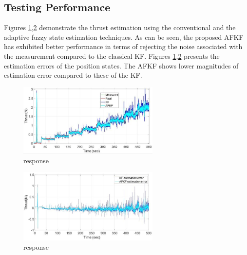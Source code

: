 \documentclass[conference]{IEEEtran}
\begin{document}
\subsection{Testing Performance}
Figures \ref{akf1},\ref{akf2} demonstrate the thrust estimation using the conventional and the adaptive fuzzy state estimation techniques. As can be seen, the proposed AFKF has exhibited better performance in terms of rejecting the noise associated with the measurement compared to the classical KF. Figures \ref{akf1},\ref{akf2} presents the estimation errors of the position states. The AFKF shows lower magnitudes of estimation error compared to these of the KF. 
\begin{figure}[htbp]
	\includegraphics[width=7cm]{images/akf1.jpg}
	\caption{response}
	\label{akf1}
\end{figure}
\begin{figure}[htbp]
	\includegraphics[width=7cm]{images/akf2.jpg}
	\caption{response}
	\label{akf2}
\end{figure}
\end{document}
